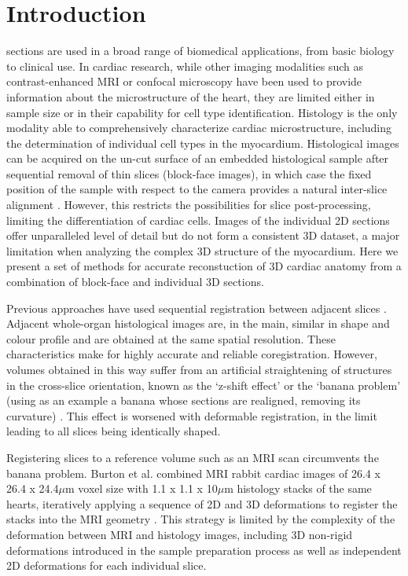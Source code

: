\section{Introduction} %
\label{sec:introduction}
   sections are used in a broad range of biomedical applications, from basic biology to clinical use. In cardiac research, while other imaging modalities such as contrast-enhanced MRI \cite{Gilbert2012} or confocal microscopy \cite{Hooks2002,Rutherford2012} have been used to provide information about the microstructure of the heart, they are limited either in sample size or in their capability for cell type identification. Histology is the only modality able to comprehensively characterize cardiac microstructure, including the determination of individual cell types in the myocardium. 
  Histological images can be acquired on the un-cut surface of an embedded histological sample after sequential removal of thin slices (block-face images), in which case the fixed position of the sample with respect to the camera provides a natural inter-slice alignment \cite{Sands2005,Sands2006,Rutherford2012}. However, this restricts the possibilities for slice post-processing, limiting the differentiation of cardiac cells. Images of the individual 2D sections offer unparalleled level of detail \cite{Burton2006,Plank2009} but do not form a consistent 3D dataset, a major limitation when analyzing the complex 3D structure of the myocardium. Here we present a set of methods for accurate reconstuction of 3D cardiac anatomy from a combination of block-face and individual 3D sections.
  
  
  Previous approaches have used sequential registration between adjacent slices \cite{Chakravarty2006,Schmitt2006,Cifor2009,Cifor2011}. Adjacent whole-organ histological images are, in the main, similar in shape and colour profile and are obtained at the same spatial resolution. These characteristics make for highly accurate and reliable coregistration. However, volumes obtained in this way suffer from an artificial straightening of structures in the cross-slice orientation, known as the `z-shift effect' \cite{Yushkevich2006} or the `banana problem' (using as an example a banana whose sections are realigned, removing its curvature) \cite{Malandain2004,Lyon2012}. This effect is worsened with deformable registration, in the limit leading to all slices being identically shaped.
  
  Registering slices to a reference volume such as an MRI scan \cite{Alic2011,Osechinskiy2011,Kimm2012} circumvents the banana problem. Burton et al. \cite{Burton2006} combined MRI rabbit cardiac images of 26.4 x 26.4 x 24.4$\mu$m voxel size with 1.1 x 1.1 x 10$\mu$m histology stacks of the same hearts, iteratively applying a sequence of 2D and 3D deformations to register the stacks into the MRI geometry \cite{Mansoori2007}. This strategy is limited by the complexity of the deformation between MRI and histology images, including 3D non-rigid deformations introduced in the sample preparation process as well as independent 2D deformations for each individual slice.  
  
